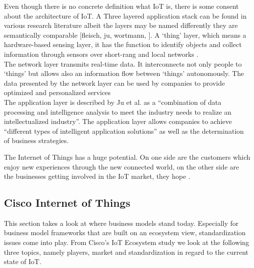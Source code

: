 	Even though there is no concrete definition what IoT is, there is some consent about the architecture of IoT. A Three layered application stack can be found in various research literature albeit the layers may be named differently they are semantically comparable [fleisch, ju, wortmann, ]. A `thing' layer, which means a hardware-based sensing layer, it has the function to identify objects and collect information through sensors over short-rang and local networks \cite{ju}.\\
	The network layer transmits real-time data. It interconnects not only people to `things' but allows also an information flow between `things' autonomously. The data presented by the network layer can be used by companies to provide optimized and personalized services \cite{ju}\\
	The application layer is described by Ju et al. as a ``combination of data processing and intelligence analysis to meet the industry needs to realize an intellectualized industry''. The application layer allows companies to achieve ``different types of intelligent application solutions'' as well as the determination of business strategies\cite{ju}.

	The Internet of Things has a huge potential. On one side are the customers which enjoy new experiences through the new connected world, on the other side are the businesses getting involved in the IoT market, they hope \cite{ju}.\\
	[TODO: potenzial beschriibe, für business und `private' bi business überleitig zu BM und section BMF ]

	\subsection{Cisco Internet of Things}
		This section takes a look at where business models stand today. Especially for business model frameworks that are built on an ecosystem view, standardization issues come into play. From Cisco's IoT Ecosystem study we look at the following three topics, namely players, market and standardization in regard to the current state of IoT.

